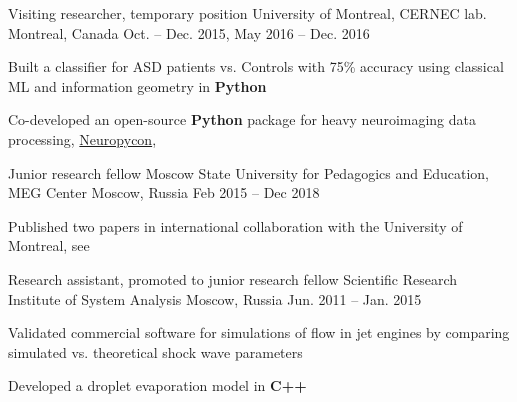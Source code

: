 \begin{cventries}
  \cventry
    {Visiting researcher, temporary position}
    {University of Montreal, CERNEC lab.}
    {Montreal, Canada}
    {Oct. -- Dec. 2015, May 2016 -- Dec. 2016}
    {
      \begin{cvitems}
      \item{Built a classifier for ASD patients vs. Controls with 75\% accuracy using classical ML and information geometry in \textbf{Python}}
          \item{Co-developed an open-source \textbf{Python} package for heavy neuroimaging data processing, \href{https://github.com/neuropycon}{Neuropycon}, \cite{Neuropycon}}
      \end{cvitems}
    }
  \cventry
    {Junior research fellow}
    {Moscow State University for Pedagogics and Education, MEG Center}
    {Moscow, Russia}
    {Feb 2015 -- Dec 2018}
    {
      \begin{cvitems}
      \item{Published two papers in international collaboration with the University of Montreal, see \cite{Alamian2017a, Alamian2017b}}
      \end{cvitems}
    }
  \cventry
    {Research assistant, promoted to junior research fellow}
    {Scientific Research Institute of System Analysis}
    {Moscow, Russia}
    {Jun. 2011 -- Jan. 2015}
    {
      \begin{cvitems}
        \item{Validated commercial software for simulations of flow in jet engines by comparing simulated vs. theoretical shock wave parameters}
        \item{Developed a droplet evaporation model in \textbf{C++}}
      \end{cvitems}
    }
\end{cventries}
